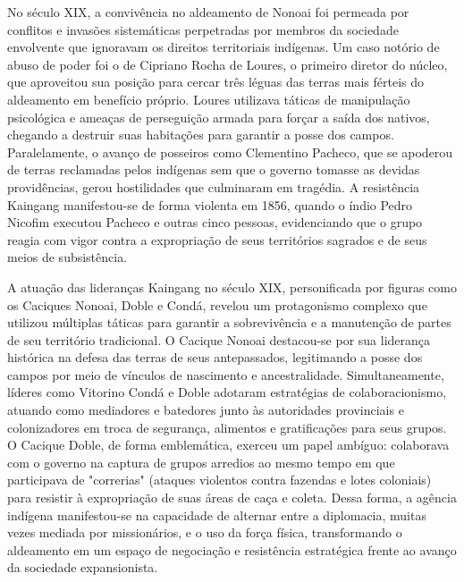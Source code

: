 \documentclass[12pt, a4paper]{article}
\begin{document}
No século XIX, a convivência no aldeamento de Nonoai foi permeada por conflitos e invasões sistemáticas perpetradas por membros da sociedade envolvente que ignoravam os direitos territoriais indígenas. Um caso notório de abuso de poder foi o de Cipriano Rocha de Loures, o primeiro diretor do núcleo, que aproveitou sua posição para cercar três léguas das terras mais férteis do aldeamento em benefício próprio. Loures utilizava táticas de manipulação psicológica e ameaças de perseguição armada para forçar a saída dos nativos, chegando a destruir suas habitações para garantir a posse dos campos. Paralelamente, o avanço de posseiros como Clementino Pacheco, que se apoderou de terras reclamadas pelos indígenas sem que o governo tomasse as devidas providências, gerou hostilidades que culminaram em tragédia. A resistência Kaingang manifestou-se de forma violenta em 1856, quando o índio Pedro Nicofim executou Pacheco e outras cinco pessoas, evidenciando que o grupo reagia com vigor contra a expropriação de seus territórios sagrados e de seus meios de subsistência.

A atuação das lideranças Kaingang no século XIX, personificada por figuras como os Caciques Nonoai, Doble e Condá, revelou um protagonismo complexo que utilizou múltiplas táticas para garantir a sobrevivência e a manutenção de partes de seu território tradicional. O Cacique Nonoai destacou-se por sua liderança histórica na defesa das terras de seus antepassados, legitimando a posse dos campos por meio de vínculos de nascimento e ancestralidade. Simultaneamente, líderes como Vitorino Condá e Doble adotaram estratégias de colaboracionismo, atuando como mediadores e batedores junto às autoridades provinciais e colonizadores em troca de segurança, alimentos e gratificações para seus grupos. O Cacique Doble, de forma emblemática, exerceu um papel ambíguo: colaborava com o governo na captura de grupos arredios ao mesmo tempo em que participava de "correrias" (ataques violentos contra fazendas e lotes coloniais) para resistir à expropriação de suas áreas de caça e coleta. Dessa forma, a agência indígena manifestou-se na capacidade de alternar entre a diplomacia, muitas vezes mediada por missionários, e o uso da força física, transformando o aldeamento em um espaço de negociação e resistência estratégica frente ao avanço da sociedade expansionista.
\end{document}
